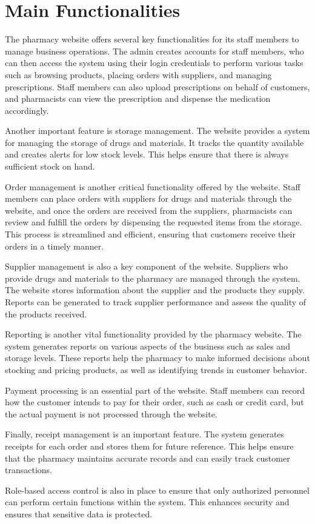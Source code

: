\section{Main Functionalities}
\hspace{1cm} The pharmacy website offers several key functionalities for its staff members to manage business operations. The admin creates accounts for staff members, who can then access the system using their login credentials to perform various tasks such as browsing products, placing orders with suppliers, and managing prescriptions. 
Staff members can also upload prescriptions on behalf of customers, and pharmacists can view the prescription and dispense the medication accordingly.\par
Another important feature is storage management. The website provides a system for managing the
storage of drugs and materials. It tracks the quantity available and creates alerts for low stock levels.
This helps ensure that there is always sufficient stock on hand.\par
Order management is another critical functionality offered by the website. Staff members can place orders with suppliers for drugs and materials through the website, and once the orders are received
from the suppliers, pharmacists can review and fulfill the orders by dispensing the requested items from the storage. This process is streamlined and efficient, ensuring that customers receive their orders in a timely manner.\par
Supplier management is also a key component of the website. Suppliers who provide drugs and materials to the pharmacy are managed through the system. The website stores information about the supplier and the products they supply. Reports can be generated to track supplier performance and assess the quality of the products received.\par
Reporting is another vital functionality provided by the pharmacy website. The system generates reports on various aspects of the business such as sales and storage levels. These reports help the pharmacy to make informed decisions about stocking and pricing products, as well as identifying trends in customer behavior.\par
Payment processing is an essential part of the website. Staff members can record how the customer intends to pay for their order, such as cash or credit card, but the actual payment is not processed through the website.\par
Finally, receipt management is an important feature. The system generates receipts for each order and stores them for future reference. This helps ensure that the pharmacy maintains accurate records and can easily track customer transactions.\par
Role-based access control is also in place to ensure that only authorized personnel can perform
certain functions within the system. This enhances security and ensures that sensitive data is protected.
\
\\
\
\\
\
\\
\\
\
